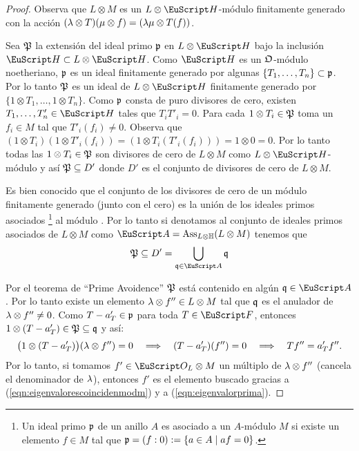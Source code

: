 \documentclass[../../tesis_maestria]{subfiles}
\begin{document}
\begin{proof}
  Observa que $L\otimes M$ es un $L\otimes\Hh$-m\'odulo finitamente generado con la acci\'on
  $(\lambda\otimes T)(\mu\otimes f)=(\lambda\mu\otimes T(f))$. 

  Sea $\mathfrak{P}$ la extensi\'on del ideal primo $\mathfrak{p}$ en $L\otimes\Hh$ bajo la inclusi\'on
  $\Hh\subset L\otimes\Hh$. Como $\Hh$ es un $\mathfrak{O}$-m\'odulo noetheriano, $\mathfrak{p}$ es un ideal
  finitamente generado por algunas $\{T_1,\dots,T_n\}\subset\mathfrak{p}$. Por lo tanto $\mathfrak{P}$ es un ideal
  de $L\otimes\Hh$ finitamente generado por $\{1\otimes T_1,\ldots,1\otimes T_n\}$.
  Como $\mathfrak{p}$ consta de puro divisores de cero, existen $T_1,\ldots,T'_n\in\Hh$ tales que $T_iT'_i=0$.
  Para cada $1\otimes T_i\in\mathfrak{P}$ toma un $f_i\in M$ tal que $T'_i(f_i)\neq 0$. Observa que
  $(1\otimes T_i)(1\otimes T'_i(f_i))=(1\otimes T_i(T'_i(f_i)))=1\otimes 0=0$. Por lo tanto
  todas las $1\otimes T_i\in\mathfrak{P}$ son divisores de cero de $L\otimes M$ como
  $L\otimes\Hh$-m\'odulo y as\'i $\mathfrak{P}\subseteq D'$ donde $D'$ es el conjunto de divisores
  de cero de $L\otimes M$.

  Es bien conocido que el conjunto de los divisores de cero de un m\'odulo
  finitamente generado (junto con el cero) es la uni\'on de los ideales primos asociados%
  \footnote{Un ideal primo $\mathfrak{p}$ de un anillo $A$ es asociado a un $A$-m\'odulo $M$ si existe un
  elemento $f\in M$ tal que $\mathfrak{p}=(f:0):=\{a\in A \mid af=0\}$.}
al m\'odulo \cite[teorema 3.1, pg 89]{EisenbudCAWAVTAG}. Por lo tanto si denotamos al conjunto
de ideales primos asociados de $L\otimes M$ como $\Aa=\mathrm{Ass}_{L\otimes\HH}(L\otimes M)$
tenemos que
\[
  \fP \subseteq D'=\bigcup_{\q\in \Aa}\q
\]

Por el teorema de ``Prime Avoidence'' $\mathfrak{P}$ est\'a contenido en alg\'un $\q\in\Aa$. Por lo tanto
existe un elemento $\lambda\otimes f''\in L\otimes M$ tal que $\mathfrak{q}$ es el anulador de
$\lambda\otimes f''\neq0$. Como $T-a'_T\in\mathfrak{p}$ para toda $T\in\Ff$, entonces
$1\otimes(T-a'_T)\in\mathfrak{P}\subseteq\mathfrak{q}$ y as\'i:
\begin{equation}\label{eqn:eigenvalorprima}
  \big(1\otimes(T-a'_T)\big)(\lambda\otimes f'')=0 \quad\Longrightarrow\quad (T-a'_T)(f'')=0 \quad\Longrightarrow\quad
  Tf''=a'_Tf''.
\end{equation}
Por lo tanto, si tomamos $f'\in\Oo_L\otimes M$ un m\'ultiplo de $\lambda\otimes f''$ (cancela el
denominador de $\lambda$), entonces $f'$ es el elemento buscado gracias a
(\ref{eqn:eigenvalorescoincidenmodm}) y a
(\ref{eqn:eigenvalorprima}).
\end{proof}
  

\begin{comment}
Este teorema requiere, de manera esencial, el siguiente resultado debido a Deligne:
\begin{thm}%
  (Deligne) Sea $f\in M_k(\Gamma_0(N),\eps)$ una forma modular de peso $k\geq2$ distinto de 0.
  Supongamos que $f$ es un vector propio para $T_p$ con valor propio $a_p$ para todo primo
  $p\nmid N$.
\end{thm}%
\end{comment}
\end{document}
